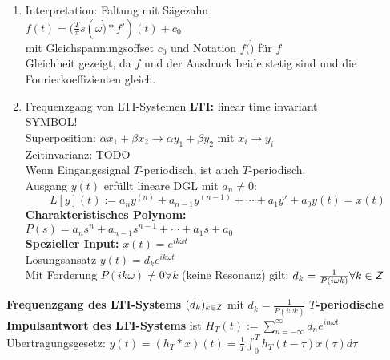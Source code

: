 \documentclass[nocolor,german]{latex4ei/latex4ei_sheet}
\begin{document}
	\begin{enumerate}
		\item Interpretation: Faltung mit S\"agezahn\\
			$f(t)=(\frac{T}{\pi}s(\omega \dot) \ast f')(t)+c_0$\\
			mit Gleichspannungsoffset $c_0$ und Notation $f(\dot)$ f\"ur $f$\\
			Gleichheit gezeigt, da $f$ und der Ausdruck beide stetig sind und die Fourierkoeffizienten gleich.
		\item Frequenzgang von LTI-Systemen
			\textbf{LTI:} linear time invariant\\
			SYMBOL!\\
			Superposition: $\alpha x_1 + \beta x_2 \rightarrow \alpha y_1 + \beta y_2$ mit $x_i \rightarrow y_i$\\
			Zeitinvarianz: TODO\\
			Wenn Eingangssignal $T$-periodisch, ist auch $T$-periodisch.\\
			Ausgang $y(t)$ erf\"ullt lineare DGL mit $a_n \neq 0$:\\
			\[L[y](t):=a_n y^{(n)}+a_{n-1} y^{(n-1)}+\cdots+a_1 y'+a_0 y(t)=x(t)\]
			\textbf{Charakteristisches Polynom:}\\	
			$P(s)=a_n s^n + a_{n-1} s^{n-1} + \cdots + a_1 s + a_0$\\
			\textbf{Spezieller Input:} $x(t)=e^{i k \omega t}$\\
			L\"osungsansatz $y(t)=d_k e^{i k \omega t}$\\
			Mit Forderung $P(i k \omega)\neq 0 \forall k$ (keine Resonanz) gilt: $d_k=\frac{1}{P(i \omega k)} \forall k \in \operatorname{\textsf{\textit{Z}}}$
	\end{enumerate}
	\textbf{Frequenzgang des LTI-Systems}
	$(d_k)_{k \in \operatorname{\textsf{\textit{Z}}}}$ mit $d_k=\frac{1}{P(i \omega k)}$
	\textbf{$T$-periodische Impulsantwort des LTI-Systems} ist $H_T(t):=\sum_{n=-\infty}^{\infty} d_n e^{i n \omega t}$\\
	\"Ubertragungsgesetz: $y(t)=(h_T \ast x)(t)=\frac{1}{T} \int_{0}^T h_T(t-\tau)x(\tau)d \tau$\\
\end{document}
